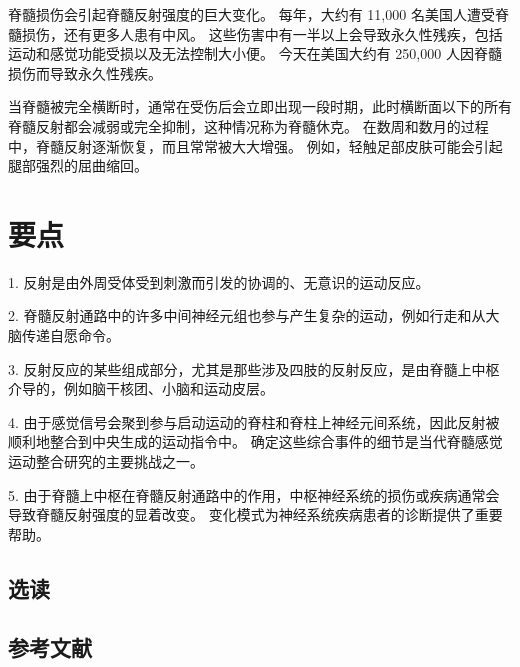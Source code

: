 脊髓损伤会引起脊髓反射强度的巨大变化。 每年，大约有 11,000 名美国人遭受脊髓损伤，还有更多人患有中风。 这些伤害中有一半以上会导致永久性残疾，包括运动和感觉功能受损以及无法控制大小便。 今天在美国大约有 250,000 人因脊髓损伤而导致永久性残疾。

当脊髓被完全横断时，通常在受伤后会立即出现一段时期，此时横断面以下的所有脊髓反射都会减弱或完全抑制，这种情况称为脊髓休克。 在数周和数月的过程中，脊髓反射逐渐恢复，而且常常被大大增强。 例如，轻触足部皮肤可能会引起腿部强烈的屈曲缩回。


\section{要点}
1. 反射是由外周受体受到刺激而引发的协调的、无意识的运动反应。 

2. 脊髓反射通路中的许多中间神经元组也参与产生复杂的运动，例如行走和从大脑传递自愿命令。 

3. 反射反应的某些组成部分，尤其是那些涉及四肢的反射反应，是由脊髓上中枢介导的，例如脑干核团、小脑和运动皮层。 

4. 由于感觉信号会聚到参与启动运动的脊柱和脊柱上神经元间系统，因此反射被顺利地整合到中央生成的运动指令中。 确定这些综合事件的细节是当代脊髓感觉运动整合研究的主要挑战之一。 

5. 由于脊髓上中枢在脊髓反射通路中的作用，中枢神经系统的损伤或疾病通常会导致脊髓反射强度的显着改变。 变化模式为神经系统疾病患者的诊断提供了重要帮助。

\subsection{选读}
\subsection{参考文献}